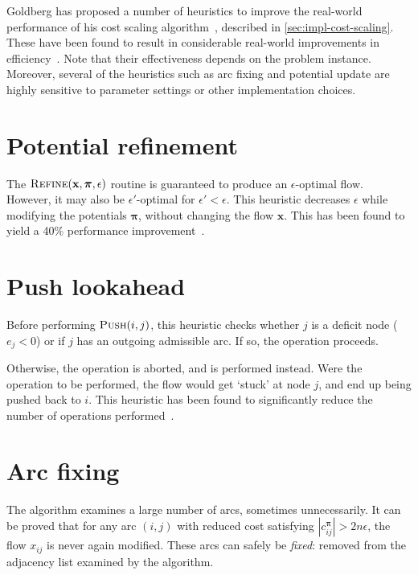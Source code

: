 Goldberg has proposed a number of heuristics to improve the real-world performance of his cost scaling algorithm~\cite{Goldberg:1997}, described in \cref{sec:impl-cost-scaling}. These have been found to result in considerable real-world improvements in efficiency~\cite{Bunnagel:1998,KiralyKovacs:2012}. Note that their effectiveness depends on the problem instance. Moreover, several of the heuristics such as arc fixing and potential update are highly sensitive to parameter settings or other implementation choices.

\section{Potential refinement} \label{appendix:csheuristics-potential-refinement}
The $\textproc{Refine}(\mathbf{x},\boldsymbol{\pi},\epsilon)$ routine is guaranteed to produce an $\epsilon$-optimal flow. However, it may also be $\epsilon'$-optimal for $\epsilon' < \epsilon$. This heuristic decreases $\epsilon$ while modifying the potentials $\boldsymbol{\pi}$, without changing the flow $\mathbf{x}$. This has been found to yield a 40\% performance improvement~\cite{Bunnagel:1998}.

\section{Push lookahead}
Before performing $\textproc{Push}(i,j)$, this heuristic checks whether $j$ is a deficit node ($e_j < 0$) or if $j$ has an outgoing admissible arc. If so, the  operation proceeds.

Otherwise, the  operation is aborted, and  is performed instead. Were the  operation to be performed, the flow would get `stuck' at node $j$, and end up being pushed back to $i$. This heuristic has been found to significantly reduce the number of  operations performed~\cite{Goldberg:1997}.

\section{Arc fixing}
The algorithm examines a large number of arcs, sometimes unnecessarily. It can be proved that for any arc $(i,j)$ with reduced cost satisfying $\left|c^{\boldsymbol{\pi}}_{ij}\right| > 2n\epsilon$, the flow $x_{ij}$ is never again modified. These arcs can safely be \emph{fixed}: removed from the adjacency list examined by the algorithm. 

